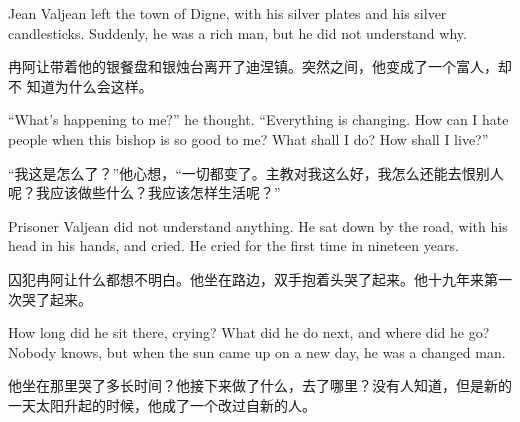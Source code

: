 \documentclass[fontset=ubuntu, zihao=5]{ctexart}
\begin{document}
\begin{paracol}{2}
  \switchcolumn*

  \sectionbreak

  Jean Valjean left the town of Digne, with his silver plates and his silver candlesticks. Suddenly, he was a rich man, but he did not understand why.

  \switchcolumn

  \sectionbreak

  冉阿让带着他的银餐盘和银烛台离开了迪涅镇。突然之间，他变成了一个富人，却不
  知道为什么会这样。

  \switchcolumn*

  ``What's happening to me?'' he thought. ``Everything is changing. How can I hate people when this bishop is so good to me? What shall I do? How shall I live?''

  \switchcolumn
  “我这是怎么了？”他心想，“一切都变了。主教对我这么好，我怎么还能去恨别人呢？我应该做些什么？我应该怎样生活呢？”

  \switchcolumn*

  Prisoner Valjean did not understand anything. He sat down by the road, with his head in his hands, and cried. He cried for the first time in nineteen years.

  \switchcolumn

  囚犯冉阿让什么都想不明白。他坐在路边，双手抱着头哭了起来。他十九年来第一次哭了起来。

  \switchcolumn*

  How long did he sit there, crying? What did he do next, and where did he go? Nobody knows, but when the sun came up on a new day, he was a changed man.

  \switchcolumn

  他坐在那里哭了多长时间？他接下来做了什么，去了哪里？没有人知道，但是新的一天太阳升起的时候，他成了一个改过自新的人。



\end{paracol}
\end{document}
